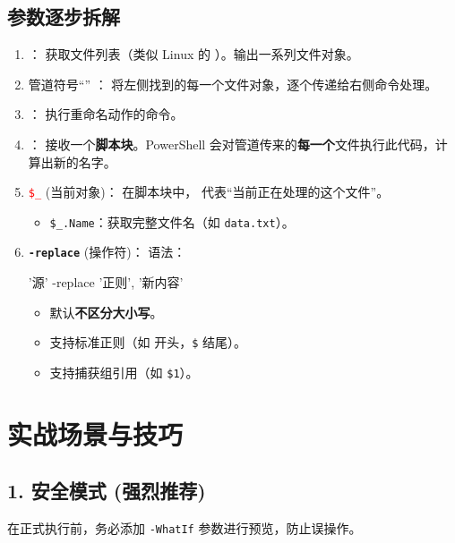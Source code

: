 \documentclass[10pt,CJKmath]{ctexart}
\begin{document}
\subsection{参数逐步拆解}
\begin{enumerate}
	\item {}：
	获取文件列表（类似 Linux 的 ）。输出一系列文件对象。
	
	\item 管道符号“\ci{|}” ：
	将左侧找到的每一个文件对象，逐个传递给右侧命令处理。
	
	\item {}：
	执行重命名动作的命令。
	
	\item {}：
	接收一个\textbf{脚本块}。PowerShell 会对管道传来的\textbf{每一个}文件执行此代码，计算出新的名字。
	
	\item \textcolor{red}{\texttt{\$\_}} (当前对象)：
	在脚本块中，\ci{\$\_} 代表“当前正在处理的这个文件”。
	\begin{itemize}
		\item \texttt{\$\_.Name}：获取完整文件名（如 \texttt{data.txt}）。
	\end{itemize}
	
	\item \textbf{\texttt{-replace}} (操作符)：
	语法：
	\begin{code}
		'源' -replace '正则', '新内容'
	\end{code}
	\begin{itemize}
		\item 默认\textbf{不区分大小写}。
		\item 支持标准正则（如 \ci{^} 开头，\texttt{\$} 结尾）。
		\item 支持捕获组引用（如 \texttt{\$1}）。
	\end{itemize}
\end{enumerate}

\section{实战场景与技巧}

\subsection{1. 安全模式 (强烈推荐)}
在正式执行前，务必添加 \texttt{-WhatIf} 参数进行预览，防止误操作。
\end{document}
